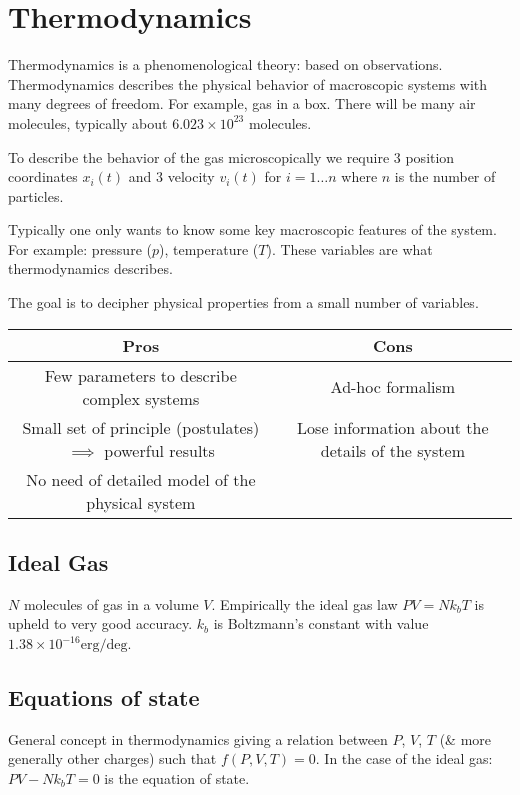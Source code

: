 \section{Thermodynamics}

Thermodynamics is a phenomenological theory: based on observations. Thermodynamics describes the physical behavior of macroscopic systems with many degrees of freedom. For example, gas in a box. There will be many air molecules, typically about $6.023 \times 10^{23}$ molecules.

To describe the behavior of the gas microscopically we require 3 position coordinates $x_i (t)$ and 3 velocity $v_i (t)$ for $i = 1 \ldots n$ where $n$ is the number of particles.

Typically one only wants to know some key macroscopic features of the system. For example: pressure ($p$), temperature ($T$). These variables are what thermodynamics describes.

The goal is to decipher physical properties from a small number of variables.

\begin{center}
\begin{tabular}{|c|c|}
\hline
Pros & Cons \\
\hline
Few parameters to describe complex systems & Ad-hoc formalism \\
\hline
Small set of principle (postulates) $\implies$ powerful results & Lose information about the details of the system \\
\hline
No need of detailed model of the physical system & \\ 
\hline
\end{tabular}
\end{center}

\subsection{Ideal Gas}

$N$ molecules of gas in a volume $V$. Empirically the ideal gas law $PV = N k_b T$ is upheld to very good accuracy. $k_b$ is Boltzmann's constant with value $1.38 \times 10^{-16} \text{erg}/\text{deg}$. 

\subsection{Equations of state}

General concept in thermodynamics giving a relation between $P$, $V$, $T$ (\& more generally other charges) such that $f(P, V, T) = 0$. In the case of the ideal gas: $PV - N k_b T = 0$ is the equation of state.

